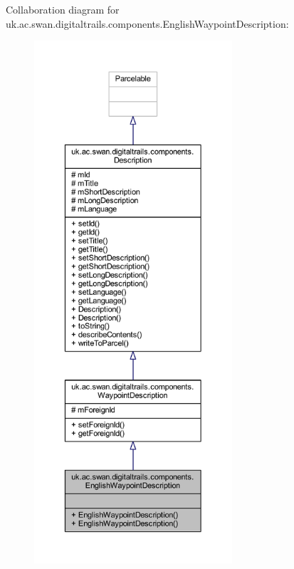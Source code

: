Collaboration diagram for uk.\+ac.\+swan.\+digitaltrails.\+components.\+English\+Waypoint\+Description\+:
\nopagebreak
\begin{figure}[H]
\begin{center}
\leavevmode
\includegraphics[height=550pt]{classuk_1_1ac_1_1swan_1_1digitaltrails_1_1components_1_1_english_waypoint_description__coll__graph}
\end{center}
\end{figure}
